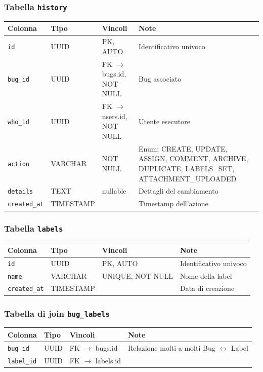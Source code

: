 ﻿\documentclass[a4paper,11pt]{article}
\begin{document}
\subsubsection{Tabella \texttt{history}}

\begin{tabular}{|l|l|l|p{5cm}|}
\hline
\textbf{Colonna} & \textbf{Tipo} & \textbf{Vincoli} & \textbf{Note} \\
\hline
\texttt{id} & UUID & PK, AUTO & Identificativo univoco \\
\hline
\texttt{bug\_id} & UUID & FK $\to$ bugs.id, NOT NULL & Bug associato \\
\hline
\texttt{who\_id} & UUID & FK $\to$ users.id, NOT NULL & Utente esecutore \\
\hline
\texttt{action} & VARCHAR & NOT NULL & Enum: CREATE, UPDATE, ASSIGN, COMMENT, ARCHIVE, DUPLICATE, LABELS\_SET, ATTACHMENT\_UPLOADED \\
\hline
\texttt{details} & TEXT & nullable & Dettagli del cambiamento \\
\hline
\texttt{created\_at} & TIMESTAMP & & Timestamp dell'azione \\
\hline
\end{tabular}

\subsubsection{Tabella \texttt{labels}}

\begin{tabular}{|l|l|l|p{5cm}|}
\hline
\textbf{Colonna} & \textbf{Tipo} & \textbf{Vincoli} & \textbf{Note} \\
\hline
\texttt{id} & UUID & PK, AUTO & Identificativo univoco \\
\hline
\texttt{name} & VARCHAR & UNIQUE, NOT NULL & Nome della label \\
\hline
\texttt{created\_at} & TIMESTAMP & & Data di creazione \\
\hline
\end{tabular}

\subsubsection{Tabella di join \texttt{bug\_labels}}

\begin{tabular}{|l|l|l|p{5cm}|}
\hline
\textbf{Colonna} & \textbf{Tipo} & \textbf{Vincoli} & \textbf{Note} \\
\hline
\texttt{bug\_id} & UUID & FK $\to$ bugs.id & Relazione molti-a-molti Bug $\leftrightarrow$ Label \\
\hline
\texttt{label\_id} & UUID & FK $\to$ labels.id & \\
\hline
\end{tabular}
\end{document}
